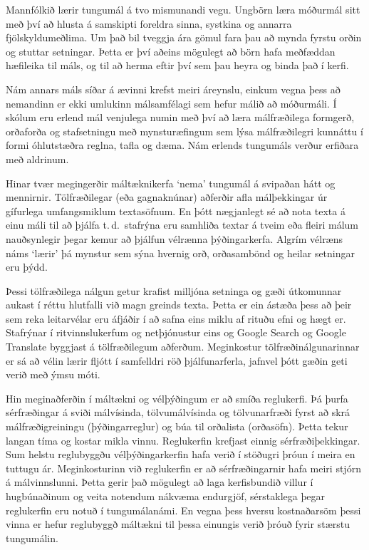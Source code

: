 \documentclass{../../metanetpaper}
\begin{document}
\begin{multicols}{2}

Mannfólkið lærir tungumál á tvo mismunandi vegu. Ungbörn læra móðurmál sitt með því að hlusta á samskipti foreldra sinna, systkina og annarra fjölskyldumeðlima. Um það bil tveggja ára gömul fara þau að mynda fyrstu orðin og stuttar setningar. Þetta er því aðeins mögulegt að börn hafa meðfæddan hæfileika til máls, og til að herma eftir því sem þau heyra og binda það í kerfi.

Nám annars máls síðar á ævinni krefst meiri áreynslu, einkum vegna þess að nemandinn er ekki umlukinn málsamfélagi sem hefur málið að móðurmáli. Í skólum eru erlend mál venjulega numin með því að læra málfræðilega formgerð, orðaforða og stafsetningu með mynsturæfingum sem lýsa málfræðilegri kunnáttu í formi óhlutstæðra reglna, tafla og dæma. Nám erlends tungumáls verður erfiðara með aldrinum.

Hinar tvær megingerðir máltæknikerfa ‘nema’ tungumál á svipaðan hátt og mennirnir. Tölfræðilegar (eða gagnaknúnar) aðferðir afla málþekkingar úr gífurlega umfangsmiklum textasöfnum. En þótt nægjanlegt sé að nota texta á einu máli til að þjálfa t.\,d.~stafrýna eru samhliða textar á tveim eða fleiri málum nauðsynlegir þegar kemur að þjálfun vélrænna þýðingarkerfa. Algrím vélræns náms ‘lærir’ þá mynstur sem sýna hvernig orð, orðasambönd og heilar setningar eru þýdd.

Þessi tölfræðilega nálgun getur krafist milljóna setninga og gæði útkomunnar aukast í réttu hlutfalli við magn greinds texta. Þetta er ein ástæða þess að þeir sem reka leitarvélar eru áfjáðir í að safna eins miklu af rituðu efni og hægt er. Stafrýnar í ritvinnslukerfum og netþjónustur eins og Google Search og Google Translate byggjast á tölfræðilegum aðferðum. Meginkostur tölfræðinálgunarinnar er sá að vélin lærir fljótt í samfelldri röð þjálfunarferla, jafnvel þótt gæðin geti verið með ýmsu móti.

Hin meginaðferðin í máltækni og vélþýðingum er að smíða reglukerfi. Þá þurfa sérfræðingar á sviði málvísinda, tölvumálvísinda og tölvunarfræði fyrst að skrá málfræðigreiningu (þýðingarreglur) og búa til orðalista (orðasöfn). Þetta tekur langan tíma og kostar mikla vinnu. Reglukerfin krefjast einnig sérfræðiþekkingar. Sum helstu reglubyggðu vélþýðingarkerfin hafa verið í stöðugri þróun í meira en tuttugu ár. Meginkosturinn við reglukerfin er að sérfræðingarnir hafa meiri stjórn á málvinnslunni. Þetta gerir það mögulegt að laga kerfisbundið villur í hugbúnaðinum og veita notendum nákvæma endurgjöf, sérstaklega þegar reglukerfin eru notuð í tungumálanámi. En vegna þess hversu kostnaðarsöm þessi vinna er hefur reglubyggð máltækni til þessa einungis verið þróuð fyrir stærstu tungumálin.


\end{multicols}
\end{document}
